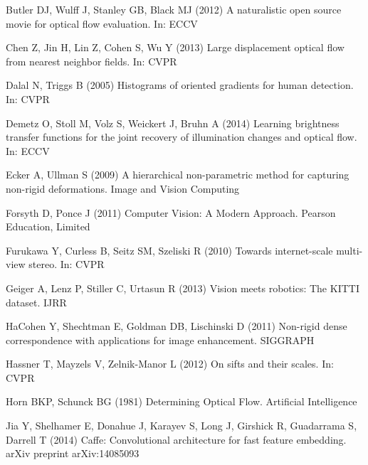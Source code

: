 \documentclass[twocolumn,natbib]{svjour3}
\begin{document}
\begin{thebibliography}{57}
Butler DJ, Wulff J, Stanley GB, Black MJ (2012) A naturalistic open source
  movie for optical flow evaluation. In: ECCV

Chen Z, Jin H, Lin Z, Cohen S, Wu Y (2013) Large displacement optical flow from
  nearest neighbor fields. In: CVPR

Dalal N, Triggs B (2005) Histograms of oriented gradients for human detection.
  In: CVPR

Demetz O, Stoll M, Volz S, Weickert J, Bruhn A (2014) Learning brightness
  transfer functions for the joint recovery of illumination changes and optical
  flow. In: ECCV

Ecker A, Ullman S (2009) A hierarchical non-parametric method for capturing
  non-rigid deformations. Image and Vision Computing

Forsyth D, Ponce J (2011) Computer Vision: A Modern Approach. Pearson
  Education, Limited

Furukawa Y, Curless B, Seitz SM, Szeliski R (2010) Towards internet-scale
  multi-view stereo. In: CVPR

Geiger A, Lenz P, Stiller C, Urtasun R (2013) Vision meets robotics: The
  {KITTI} dataset. IJRR

HaCohen Y, Shechtman E, Goldman DB, Lischinski D (2011) Non-rigid dense
  correspondence with applications for image enhancement. SIGGRAPH

Hassner T, Mayzels V, Zelnik{-}Manor L (2012) On sifts and their scales. In:
  {CVPR}

Horn BKP, Schunck BG (1981) {Determining Optical Flow}. Artificial Intelligence

Jia Y, Shelhamer E, Donahue J, Karayev S, Long J, Girshick R, Guadarrama S,
  Darrell T (2014) Caffe: Convolutional architecture for fast feature
  embedding. arXiv preprint arXiv:14085093


\end{thebibliography}
\end{document}
